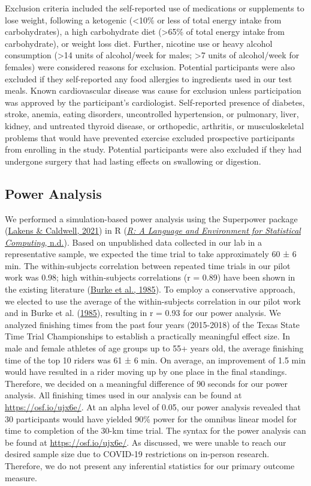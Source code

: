 \documentclass[]{cik}%
\begin{document}
Exclusion criteria included the self-reported use of medications or
supplements to lose weight, following a ketogenic (\textless10\% or less
of total energy intake from carbohydrates), a high carbohydrate diet
(\textgreater65\% of total energy intake from carbohydrate), or weight
loss diet. Further, nicotine use or heavy alcohol consumption
(\textgreater14 units of alcohol/week for males; \textgreater7 units of
alcohol/week for females) were considered reasons for exclusion.
Potential participants were also excluded if they self-reported any food
allergies to ingredients used in our test meals. Known cardiovascular
disease was cause for exclusion unless participation was approved by the
participant's cardiologist. Self-reported presence of diabetes, stroke,
anemia, eating disorders, uncontrolled hypertension, or pulmonary,
liver, kidney, and untreated thyroid disease, or orthopedic, arthritis,
or musculoskeletal problems that would have prevented exercise excluded
prospective participants from enrolling in the study. Potential
participants were also excluded if they had undergone surgery that had
lasting effects on swallowing or digestion.

\hypertarget{power-analysis}{%
\subsection{Power Analysis}\label{power-analysis}}

We performed a simulation-based power analysis using the Superpower
package (\protect\hyperlink{ref-38}{Lakens \& Caldwell, 2021}) in R
(\protect\hyperlink{ref-31}{\emph{R: A Language and Environment for
Statistical Computing}, n.d.}). Based on unpublished data collected in
our lab in a representative sample, we expected the time trial to take
approximately 60 ± 6 min. The within-subjects correlation between
repeated time trials in our pilot work was 0.98; high within-subjects
correlations (r = 0.89) have been shown in the existing literature
(\protect\hyperlink{ref-18}{Burke et al., 1985}). To employ a
conservative approach, we elected to use the average of the
within-subjects correlation in our pilot work and in Burke et al.
(\protect\hyperlink{ref-18}{1985}), resulting in r = 0.93 for our power
analysis. We analyzed finishing times from the past four years
(2015-2018) of the Texas State Time Trial Championships to establish a
practically meaningful effect size. In male and female athletes of age
groups up to 55+ years old, the average finishing time of the top 10
riders was 61 ± 6 min. On average, an improvement of 1.5 min would have
resulted in a rider moving up by one place in the final standings.
Therefore, we decided on a meaningful difference of 90 seconds for our
power analysis. All finishing times used in our analysis can be found at
\url{https://osf.io/ujx6e/}. At an alpha level of 0.05, our power
analysis revealed that 30 participants would have yielded 90\% power for
the omnibus linear model for time to completion of the 30-km time trial.
The syntax for the power analysis can be found at
\url{https://osf.io/ujx6e/}. As discussed, we were unable to reach our
desired sample size due to COVID-19 restrictions on in-person research.
Therefore, we do not present any inferential statistics for our primary
outcome measure.
\end{document}
